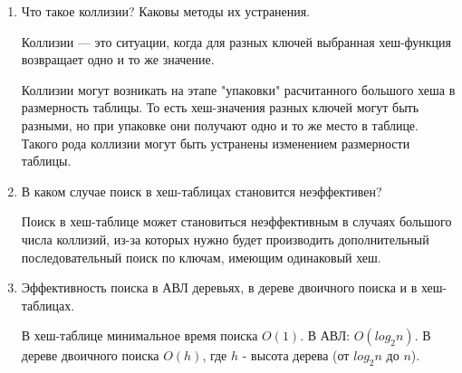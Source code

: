 \begin{enumerate}
    \item Что такое коллизии? Каковы методы их устранения.
    
    Коллизии ---  это ситуации, когда для разных ключей выбранная хеш-функция возвращает одно и то же значение. 

    Коллизии могут возникать на этапе "упаковки" расчитанного большого хеша в размерность таблицы. То есть хеш-значения разных ключей могут быть разными, но при упаковке они получают одно и то же место в таблице. Такого  рода  коллизии  могут  быть  устранены  изменением  размерности таблицы.

    \item В каком случае поиск в хеш-таблицах становится неэффективен?
    
    Поиск  в  хеш-таблице  может  становиться  неэффективным  в  случаях большого  числа  коллизий,  из-за  которых  нужно  будет  производить дополнительный  последовательный  поиск по  ключам,  имеющим одинаковый хеш.

    \item Эффективность поиска в АВЛ деревьях, в дереве двоичного поиска и в хеш-таблицах.
    
    В хеш-таблице минимальное время поиска $O(1)$. В АВЛ: $O(log_2n)$. В дереве двоичного поиска $O(h)$, где $h$ - высота дерева (от $log_2n$ до $n$).
\end{enumerate}